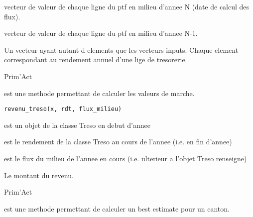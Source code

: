 \documentclass[a4paper]{book}
\begin{document}
%
\begin{Arguments}
\begin{ldescription}
\item[\code{S}] vecteur de valeur de chaque ligne du ptf en milieu d'annee N (date de calcul des flux).

\item[\code{S\_prev}] vecteur de valeur de chaque ligne du ptf en milieu d'annee N-1.
\end{ldescription}
\end{Arguments}
%
\begin{Value}
Un vecteur ayant autant d elements que les vecteurs inputs. Chaque element correspondant au rendement annuel d'une lige de tresorerie.
\end{Value}
%
\begin{Author}\relax
Prim'Act
\end{Author}
%
\begin{Description}\relax
{} est une methode permettant de calculer les valeurs de marche.
\end{Description}
%
\begin{Usage}
\begin{verbatim}
revenu_treso(x, rdt, flux_milieu)
\end{verbatim}
\end{Usage}
%
\begin{Arguments}
\begin{ldescription}
\item[\code{x}] est un objet de la classe Treso en debut d'annee

\item[\code{rdt}] est le rendement de la classe Treso au cours de l'annee (i.e. en fin d'annee)

\item[\code{flux\_milieu}] est le flux du milieu de l'annee en cours (i.e. ulterieur a l'objet Treso renseigne)
\end{ldescription}
\end{Arguments}
%
\begin{Value}
Le montant du revenu.
\end{Value}
%
\begin{Author}\relax
Prim'Act
\end{Author}
%
\begin{Description}\relax
{} est une methode permettant de calculer un best estimate pour un canton.
\end{Description}
\end{document}
